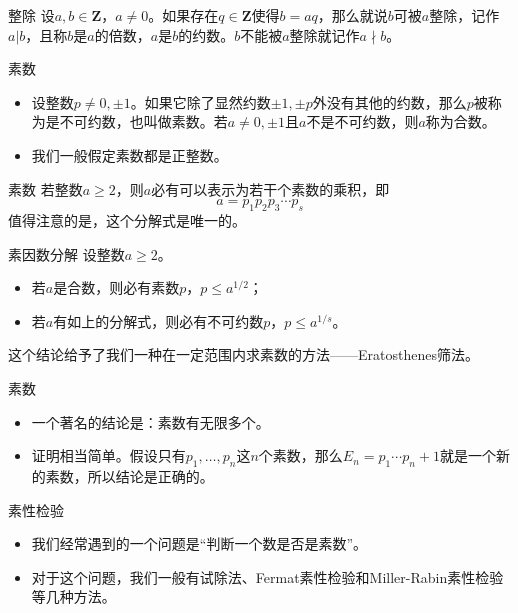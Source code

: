 \documentclass[dvipdfmx]{beamer}
\newcommand{\Z}{\boldsymbol{Z}}
\begin{document}
\begin{frame}{整除}
设$a,b\in \Z$，$a\neq 0$。如果存在$q\in \Z$使得$b=aq$，那么就说$b$可被$a$整除，记作$a|b$，且称$b$是$a$的倍数，$a$是$b$的约数。$b$不能被$a$整除就记作$a\nmid b$。
\end{frame}

\begin{frame}{素数}
\begin{itemize}
\item 设整数$p\neq 0,\pm 1$。如果它除了显然约数$\pm 1,\pm p$外没有其他的约数，那么$p$被称为是不可约数，也叫做素数。若$a\neq 0,\pm 1$且$a$不是不可约数，则$a$称为合数。
\item 我们一般假定素数都是正整数。
\end{itemize}
\end{frame}

\begin{frame}{素数}
若整数$a\geq 2$，则$a$必有可以表示为若干个素数的乘积，即
\begin{displaymath}
a = p_1p_2p_3\dotsm p_s
\end{displaymath}
值得注意的是，这个分解式是唯一的。
\end{frame}

\begin{frame}{素因数分解}
设整数$a\geq 2$。
\begin{itemize}
\item 若$a$是合数，则必有素数$p$，$p\leq a^{1/2}$；
\item 若$a$有如上的分解式，则必有不可约数$p$，$p\leq a^{1/s}$。
\end{itemize}
这个结论给予了我们一种在一定范围内求素数的方法——Eratosthenes筛法。
\end{frame}

\begin{frame}{素数}
\begin{itemize}
\item 一个著名的结论是：素数有无限多个。
\item 证明相当简单。假设只有$p_1,\dotsc,p_n$这$n$个素数，那么$E_n=p_1\dotsm p_n+1$就是一个新的素数，所以结论是正确的。
\end{itemize}
\end{frame}

\begin{frame}{素性检验}
\begin{itemize}
\item 我们经常遇到的一个问题是“判断一个数是否是素数”。
\item 对于这个问题，我们一般有试除法、Fermat素性检验和Miller-Rabin素性检验等几种方法。
\end{itemize}
\end{frame}
\end{document}
